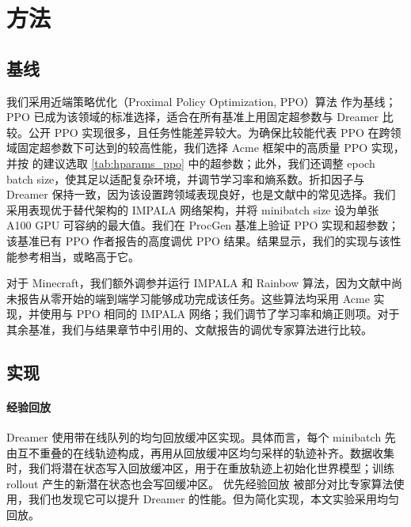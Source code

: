 \clearpage

\section*{方法}

\subsection*{基线}

我们采用近端策略优化（Proximal Policy Optimization, PPO）算法\citep{schulman2017ppo} 作为基线；PPO 已成为该领域的标准选择，适合在所有基准上用固定超参数与 Dreamer 比较。公开 PPO 实现很多，且任务性能差异较大\citep{huang2022ppodetails}。为确保比较能代表 PPO 在跨领域固定超参数下可达到的较高性能，我们选择 Acme 框架中的高质量 PPO 实现\citep{hoffman2020acme}，并按 \citet{huang2022ppodetails,andrychowicz2020whatmatters} 的建议选取 \cref{tab:hparams_ppo} 中的超参数；此外，我们还调整 epoch batch size，使其足以适配复杂环境\cite{cobbe2020procgen}，并调节学习率和熵系数。折扣因子与 Dreamer 保持一致，因为该设置跨领域表现良好，也是文献中的常见选择\citep{kapturowski2018r2d2,schrittwieser2019muzero}。我们采用表现优于替代架构的 IMPALA 网络架构\citep{cobbe2020procgen}，并将 minibatch size 设为单张 A100 GPU 可容纳的最大值。我们在 ProcGen 基准上验证 PPO 实现和超参数；该基准已有 PPO 作者报告的高度调优 PPO 结果\citep{cobbe2021ppg}。结果显示，我们的实现与该性能参考相当，或略高于它。



对于 Minecraft，我们额外调参并运行 IMPALA 和 Rainbow 算法，因为文献中尚未报告从零开始的端到端学习能够成功完成该任务\citep{guss2019minerl}。这些算法均采用 Acme 实现\citep{hoffman2020acme}，并使用与 PPO 相同的 IMPALA 网络；我们调节了学习率和熵正则项。对于其余基准，我们与结果章节中引用的、文献报告的调优专家算法进行比较。

\vspace*{-3ex}
\subsection*{实现}

\paragraph{经验回放}
Dreamer 使用带在线队列的均匀回放缓冲区实现\citep{schmitt2020laser}。具体而言，每个 minibatch 先由互不重叠的在线轨迹构成，再用从回放缓冲区均匀采样的轨迹补齐。数据收集时，我们将潜在状态写入回放缓冲区，用于在重放轨迹上初始化世界模型；训练 rollout 产生的新潜在状态也会写回缓冲区。
优先经验回放\citep{schaul2015prioritized} 被部分对比专家算法使用，我们也发现它可以提升 Dreamer 的性能。但为简化实现，本文实验采用均匀回放。

